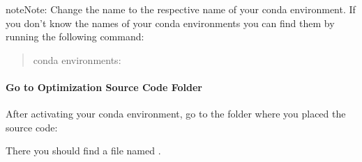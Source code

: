 \documentclass[letterpaper,10pt,english]{sphinxmanual}
\begin{document}
\begin{sphinxadmonition}{note}{Note:}
Change the name  to the respective name of your conda environment. If you don’t know the names of your conda environments you can find
them by running the following command:
\begin{quote}
\def\sphinxLiteralBlockLabel{\label{\detokenize{source/guides:id2}}}
\begin{sphinxVerbatim}[commandchars=\\\{\},numbers=left,firstnumber=1,stepnumber=1]
 conda environments:
\end{sphinxVerbatim}
\end{quote}
\end{sphinxadmonition}


\paragraph{Go to Optimization Source Code Folder}
\label{\detokenize{source/guides:go-to-optimization-source-code-folder}}
After activating your conda environment, go to the folder where you placed the source code:
\def\sphinxLiteralBlockLabel{\label{\detokenize{source/guides:id3}}}
\begin{sphinxVerbatim}[commandchars=\\\{\},numbers=left,firstnumber=1,stepnumber=1]
\end{sphinxVerbatim}

There you should find a file named .
\def\sphinxLiteralBlockLabel{\label{\detokenize{source/guides:id4}}}
%
\begin{sphinxVerbatim}[commandchars=\\\{\},numbers=left,firstnumber=1,stepnumber=1]
\end{sphinxVerbatim}
\sphinxresetverbatimhllines
\end{document}
